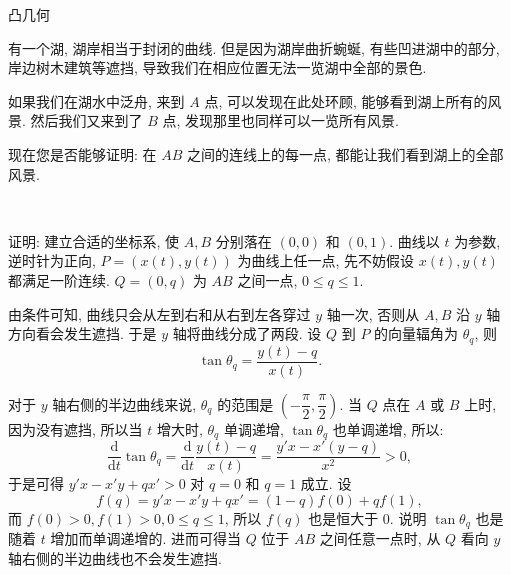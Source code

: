 \newpage
\noindent 凸几何

有一个湖, 湖岸相当于封闭的曲线. 但是因为湖岸曲折蜿蜒, 有些凹进湖中的部分, 岸边树木建筑等遮挡, 导致我们在相应位置无法一览湖中全部的景色.

如果我们在湖水中泛舟, 来到 $A$ 点, 可以发现在此处环顾, 能够看到湖上所有的风景. 然后我们又来到了 $B$ 点, 发现那里也同样可以一览所有风景.

现在您是否能够证明: 在 $AB$ 之间的连线上的每一点, 都能让我们看到湖上的全部风景.

~

证明: 建立合适的坐标系, 使 $A,B$ 分别落在 $(0,0)$ 和 $(0,1)$. 曲线以 $t$ 为参数, 逆时针为正向, $P=(x(t),y(t))$ 为曲线上任一点, 先不妨假设 $x(t), y(t)$ 都满足一阶连续. $Q = (0, q)$ 为 $AB$ 之间一点, $0\le q \le 1$.
\begin{figure*}[htbp]
\centering
{}
\end{figure*}

由条件可知, 曲线只会从左到右和从右到左各穿过 $y$ 轴一次, 否则从 $A,B$ 沿 $y$ 轴方向看会发生遮挡. 于是 $y$ 轴将曲线分成了两段. 设 $Q$ 到 $P$ 的向量辐角为 $\theta_q$, 则 
\[ \tan\theta_q = \frac{y(t) - q}{x(t)} .\]

对于 $y$ 轴右侧的半边曲线来说, $\theta_q$ 的范围是 $(-\dfrac{\pi}{2}, \dfrac{\pi}{2})$. 当 $Q$ 点在 $A$ 或 $B$ 上时, 因为没有遮挡, 所以当 $t$ 增大时, $\theta_q$ 单调递增, $\tan\theta_q$ 也单调递增, 所以:
\[\frac{\mathrm{d}}{\mathrm{d}t}\tan\theta_q = \frac{\mathrm{d}}{\mathrm{d}t}\frac{y(t) - q}{x(t)} = \frac{y'x - x'(y-q)}{x^2} > 0 ,\]
于是可得 $y'x - x'y + qx' > 0$ 对 $q=0$ 和 $q=1$ 成立.
设 
$$f(q) = y'x - x'y + qx' = (1-q)f(0) + qf(1),$$ 
而 $f(0) > 0, f(1) > 0, 0\le q\le 1$, 所以 $f(q)$ 也是恒大于 $0$. 说明 $\tan\theta_q$ 也是随着 $t$ 增加而单调递增的. 进而可得当 $Q$ 位于 $AB$ 之间任意一点时, 从 $Q$ 看向 $y$ 轴右侧的半边曲线也不会发生遮挡.

